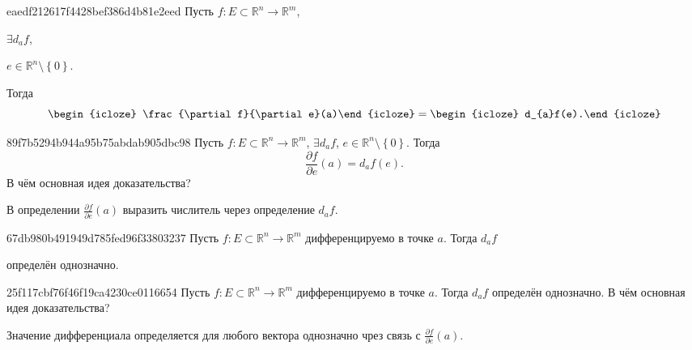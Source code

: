 \begin{note}{eaedf212617f4428bef386d4b81e2eed}
    Пусть \({ f : E \subset \mathbb R^{n} \to \mathbb R^{m} }\),\: \begin{icloze}{4}\({ \exists d_{a}f }\),\end{icloze}\: \begin{icloze}{3}\({ e \in \mathbb R^{n} \setminus \left\{ 0 \right\} }\).\end{icloze}
    Тогда
    \[
        \begin{icloze}{2}\frac{\partial f}{\partial e}(a)\end{icloze} = \begin{icloze}{1}d_{a}f(e).\end{icloze}
    \]
\end{note}

\begin{note}{89f7b5294b944a95b75abdab905dbc98}
    Пусть \({ f : E \subset \mathbb R^{n} \to \mathbb R^{m} }\),\: \({ \exists d_{a}f }\),\: \({ e \in \mathbb R^{n} \setminus \left\{ 0 \right\} }\).
    Тогда
    \[
        \frac{\partial f}{\partial e}(a) = d_{a}f(e).
    \]
    В чём основная идея доказательства?

    \begin{cloze}{1}
        В определении \({ \frac{\partial f}{\partial e}(a) }\) выразить числитель через определение \({ d_{a}f }\).
    \end{cloze}
\end{note}

\begin{note}{67db980b491949d785fed96f33803237}
    Пусть \({ f : E \subset \mathbb R^{n} \to \mathbb R^{m} }\) дифференцируемо в точке \({ a }\).
    Тогда \({ d_{a}f }\) \begin{icloze}{1}определён однозначно.\end{icloze}
\end{note}

\begin{note}{25f117cbf76f46f19ca4230ce0116654}
    Пусть \({ f : E \subset \mathbb R^{n} \to \mathbb R^{m} }\) дифференцируемо в точке \({ a }\).
    Тогда \({ d_{a}f }\) определён однозначно.
    В чём основная идея доказательства?

    \begin{cloze}{1}
        Значение дифференциала определяется для любого вектора однозначно чрез связь с \({ \frac{\partial f}{\partial e}(a) }\).
    \end{cloze}
\end{note}

